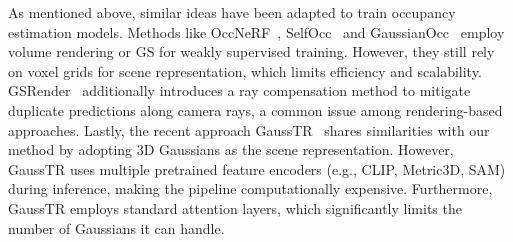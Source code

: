 As mentioned above, similar ideas have been adapted to train occupancy estimation models.
Methods like OccNeRF~\cite{zhang2023occnerf}, SelfOcc~\cite{huang2023selfocc} and GaussianOcc~\cite{gan2024gaussianocc} employ volume rendering or GS for weakly supervised training.
However, they still rely on voxel grids for scene representation, which limits efficiency and scalability.
GSRender~\cite{sun2024gsrender} additionally introduces a ray compensation method to mitigate duplicate predictions along camera rays, a common issue among rendering-based approaches.
Lastly, the recent approach GaussTR~\cite{jiang2024gausstr} shares similarities with our method by adopting 3D Gaussians as the scene representation.
However, GaussTR uses multiple pretrained feature encoders (e.g., CLIP, Metric3D, SAM) during inference, making the pipeline computationally expensive.
Furthermore, GaussTR employs standard attention layers, which significantly limits the number of Gaussians it can handle.